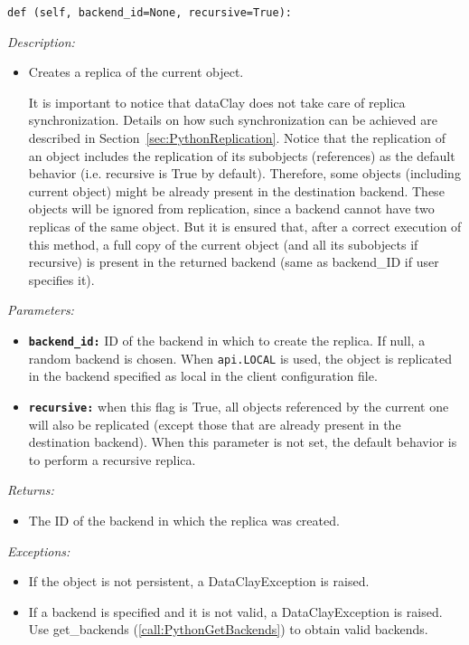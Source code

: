 \begin{dBox}
\texttt{def (self, backend\_id=None, recursive=True):}
\LINE

{\it Description:}

\begin{itemize}
    \item Creates a replica of the current object.
    
    It is important to notice that dataClay does not take care of replica synchronization. Details on how such synchronization can be achieved are described in Section~\ref{sec:PythonReplication}.
    \newline
    \newline
    Notice that the replication of an object includes the replication of its subobjects (references) as the default behavior (i.e. recursive is True by default). Therefore, some objects (including current object) might be already present in the destination backend. These objects will be ignored from replication, since a backend cannot have two replicas of the same object. But it is ensured that, after a correct execution of this method, a full copy of the current object (and all its subobjects if recursive) is present in the returned backend (same as backend\_ID if user specifies it).

\end{itemize}

{\it Parameters:}

\begin{itemize}
    \item \texttt{\bfseries backend\_id:} ID of the backend in which to create the replica. If null, a random backend is chosen. When \texttt{api.LOCAL} is used, the object is replicated in the backend specified as local in the client configuration file.
    \item \texttt{\bfseries recursive:} when this flag is True, all objects referenced by the current one will also be replicated (except those that are already present in the destination backend). When this parameter is not set, the default behavior is to perform a recursive replica.
\end{itemize}

{\it Returns:}

\begin{itemize}
    \item The ID of the backend in which the replica was created. 
\end{itemize}

{\it Exceptions:}

\begin{itemize}
    \item If the object is not persistent, a DataClayException is raised.
    \item If a backend is specified and it is not valid, a DataClayException is raised. Use get\_backends (\ref{call:PythonGetBackends}) to obtain valid backends.
\end{itemize}

\end{dBox}

